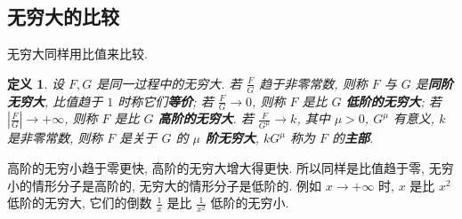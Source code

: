 \documentclass[UTF8,openany]{ctexbook}
\theoremstyle{chinesetextbook}
\newtheorem{definition}{定义}[section]
\begin{document}
\subsection{无穷大的比较}
无穷大同样用比值来比较.
\begin{definition}
设 $F,G$ 是同一过程中的无穷大. 若 $\displaystyle\frac FG$ 趋于非零常数, 则称 $F$ 与 $G$ 是\textbf{同阶无穷大}, 比值趋于 $1$ 时称它们\textbf{等价}; 若 $\displaystyle\frac FG\to0$, 则称 $F$ 是比 $G$ \textbf{低阶的无穷大}; 若 $\displaystyle\left|\frac FG\right|\to+\infty$, 则称 $F$ 是比 $G$ \textbf{高阶的无穷大}. 若 $\displaystyle\frac F{G^\mu}\to k$, 其中 $\mu>0$, $G^\mu$ 有意义, $k$ 是非零常数, 则称 $F$ 是关于 $G$ 的 \textbf{$\mu$ 阶无穷大}, $kG^\mu$ 称为 $F$ 的\textbf{主部}.
\end{definition}
高阶的无穷小趋于零更快, 高阶的无穷大增大得更快. 所以同样是比值趋于零, 无穷小的情形分子是高阶的, 无穷大的情形分子是低阶的. 例如 $x\to+\infty$ 时, $x$ 是比 $x^2$ 低阶的无穷大, 它们的倒数 $\displaystyle\frac1x$ 是比 $\displaystyle\frac1{x^2}$ 低阶的无穷小.
\end{document}

